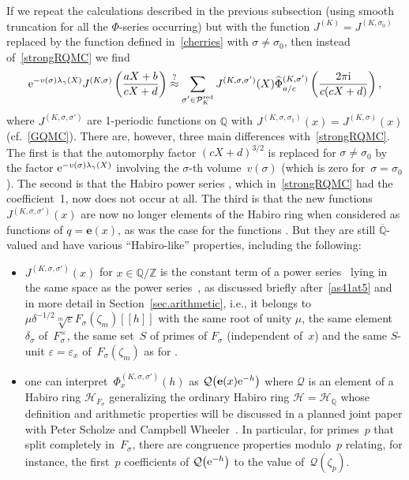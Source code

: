 \documentclass[pdftex]{sigma}
\numberwithin{equation}{section}
\def\BQ{\mathbb Q}
\def\calP{\mathcal P}
\def\calH{\mathcal H}
\def\calP{\mathcal P}
\def\l{\lambda}
\def\z{\zeta}
\def\Phih{\widehat\Phi}
\def\e{\mathbf{e}}
\def\l{\lambda}
\def\Z{\mathbb Z}
\def\Q{\mathbb Q}
\def\e{\mathbf{e}}
\def\l{\lambda}
\def\z{\zeta}
\def\s{\sigma}
\def\J{\mathbf J} \def\J{J} %
\def\Qbar{\overline{\Q}}
\def\tV{v} %
\def\be{\begin{equation}}
\def\ee{\end{equation}}
\def\ve{\varepsilon}
\def\g{\gamma}
\def\sQ{\mathcal{Q}}
\def\RED{^{\text{red}}}
\begin{document}
If we repeat the calculations described in the previous subsection (using smooth
truncation for all the $\Phi$-series occurring) but with the function
$\J^{(K)}=\J^{(K,\s_0)}$ replaced by the function defined in~\eqref{cherries} with
$\s\ne\s_0$, then instead of~\eqref{strongRQMC} we find
\be
\label{RQMCa}
{\rm e}^{-\tV(\s)\l_\g(X)}
\J^{(K,\s)}\left(\frac{aX+b}{cX+d}\right)
 \overset?\approx
\sum_{\substack{\s'\in\calP_K\RED }}
\J^{(K,\s,\s')}(X)
 \Phih^{(K,\s')}_{a/c}\left(\frac{2\pi {\rm i}}{c(cX+d)}\right) ,
\ee
where $\J^{(K,\s,\s')}$ are 1-periodic functions on $\BQ$ with
$\J^{(K,\s,\s_1)}(x) =\J^{(K,\s)}(x)$ (cf.\ \eqref{GQMC}).
There are, however, three main differences with~\eqref{strongRQMC}.
The first is that the automorphy factor ${(cX+d)^{3/2}}$ is replaced for $\s\ne\s_0$
by the factor
${\rm e}^{-\tV(\s)\l_\g(X)}$ involving the $\s$-th volume~$v(\s)$ (which is zero for~${\s=\s_0}$).
The second is that the Habiro power series \smash{$\Phih^{(K,\s_0)}_{a/c}$}, which
in~\eqref{strongRQMC} had the coefficient~1, now does not occur at all.
The third is that the new functions $\J^{(K,\s,\s')}(x)$ are now no longer elements
of the Habiro ring
when considered as functions of $q=\e(x)$, as was the case for the functions
\smash{$\J^{(K,\s_0,\s')}(x)=Q_{\s'}^{(K)}(x)$}. But they are still $\Qbar$-valued and have various
``Habiro-like'' properties, including the following:
\begin{itemize}\itemsep=0pt
\item
$\J^{(K,\s,\s')}(x)$ for $x\in\Q/\Z$ is the constant term of a power
series~\smash{$\Phi^{(K,\s,\s')}_x(h)$}
lying in the same space as the power series~\smash{$\Phi^{(K,\s)}_x(h)$}, as discussed briefly
after~\eqref{as41at5} and in more detail in Section~\ref{sec.arithmetic}, i.e.,
it belongs to $\mu \delta^{-1/2}\sqrt[m]{\ve} F_\s(\z_m)[[h]]$ with the same root
of unity $\mu$, the same element $\delta_\s$ of~$F_\s^\times$, the same set~$S$ of
primes of $F_\s$ (independent of~$x$) and the same $S$-unit $\ve=\ve_x$ of~$F_\s(\z_m)$
as for \smash{$\Phi^{(K,\s)}_x(h)$}.
\item
one can interpret~$\Phi^{(K,\s,\s')}_x(h)$ as $\sQ\big(\e(x){\rm e}^{-h}\big)$ where $\sQ$ is an
element of a Habiro ring $\calH_{F_\s}$ generalizing the ordinary Habiro ring
$\calH=\calH_\Q$ whose definition and arithmetic properties will be discussed in a
planned joint paper with Peter Scholze and Campbell Wheeler~\cite{GSZ:habiro}.
In particular, for primes~$p$
that split completely in~$F_\s$, there are congruence properties modulo~$p$ relating,
for instance, the first~$p$ coefficients of $\sQ\big({\rm e}^{-h}\big)$ to the value of~$\sQ(\z_p)$.
\end{itemize}
\end{document}
